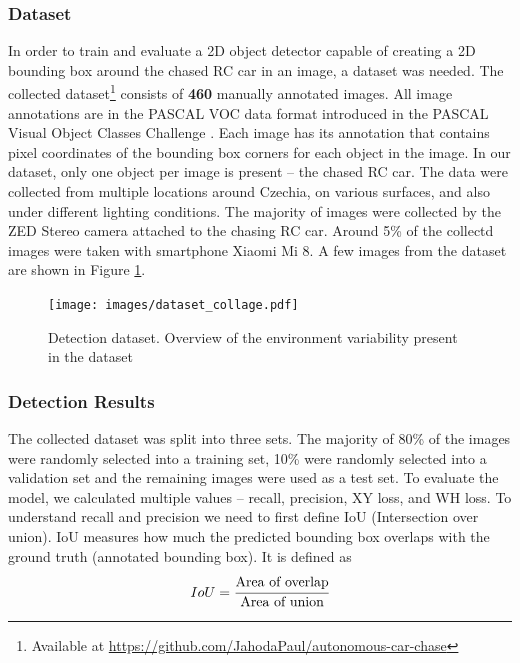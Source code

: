 \documentclass{ctuthesis/ctuthesis}
\begin{document}
\subsubsection{Dataset} \label{s:detection_dataset}
In order to train and evaluate a 2D object detector capable of creating a 2D bounding box around the chased RC car in an image, a dataset was needed. The collected dataset\footnote{Available at \href{https://github.com/JahodaPaul/autonomous-car-chase}{https://github.com/JahodaPaul/autonomous-car-chase}} consists of \textbf{460} manually annotated images. All image annotations are in the PASCAL VOC data format introduced in the PASCAL Visual Object Classes Challenge \cite{pascal-voc}. Each image has its annotation that contains pixel coordinates of the bounding box corners for each object in the image. In our dataset, only one object per image is present -- the chased RC car. The data were collected from multiple locations around Czechia, on various surfaces, and also under different lighting conditions. The majority of images were collected by the ZED Stereo camera attached to the chasing RC car. Around 5\% of the collectd images were taken with smartphone Xiaomi Mi 8. A few images from the dataset are shown in Figure \ref{f:dataset_detection}.

\begin{figure}[]
    \centering
    \texttt{[image: images/dataset\_collage.pdf]}
    
    \caption{Detection dataset. Overview of the environment variability present in the dataset}\label{f:dataset_detection}
\end{figure}


\subsubsection{Detection Results}
The collected dataset was split into three sets. The majority of 80\% of the images were randomly selected into a training set, 10\% were randomly selected into a validation set and the remaining images were used as a test set. To evaluate the model, we calculated multiple values -- recall, precision, XY loss, and WH loss. To understand recall and precision we need to first define IoU (Intersection over union). IoU measures how much the predicted bounding box overlaps with the ground truth (annotated bounding box). It is defined as 
\begin{equation}IoU = \cfrac{\textrm{Area of overlap}}{\textrm{Area of union}}\end{equation}
\end{document}
